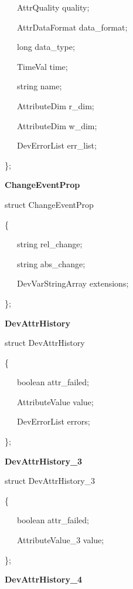 ~~~AttrQuality quality;

~~~AttrDataFormat data\_format;

~~~long data\_type;

~~~TimeVal time;

~~~string name;

~~~AttributeDim r\_dim;

~~~AttributeDim w\_dim;

~~~DevErrorList err\_list;

\};\\


\begin{flushleft}
\textbf{ChangeEventProp}
\par\end{flushleft}

struct ChangeEventProp

\{

~~~string rel\_change;

~~~string abs\_change;

~~~DevVarStringArray extensions;

\};\\


\begin{flushleft}
\textbf{DevAttrHistory}
\par\end{flushleft}

struct DevAttrHistory

\{

~~~boolean attr\_failed;

~~~AttributeValue value;

~~~DevErrorList errors;

\};\\


\begin{flushleft}
\textbf{DevAttrHistory\_3}
\par\end{flushleft}

struct DevAttrHistory\_3

\{

~~~boolean attr\_failed;

~~~AttributeValue\_3 value;

\};\\


\begin{flushleft}
\textbf{DevAttrHistory\_4}
\par\end{flushleft}

